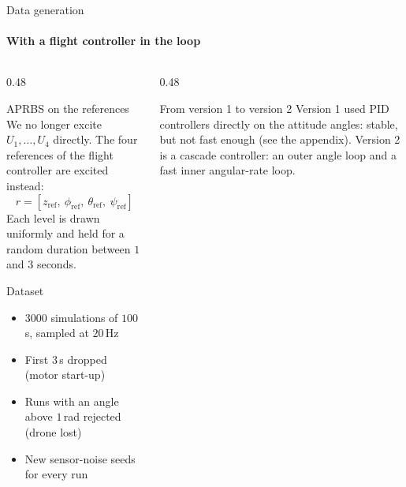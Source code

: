 \begin{frame}{Data generation}
    \framesubtitle{With a flight controller in the loop}

    \begin{columns}[T,onlytextwidth]
        \begin{column}{0.48\textwidth}
            \begin{block}{APRBS on the references}
                \footnotesize
                We no longer excite $U_1,\dots,U_4$ directly. The four
                references of the flight controller are excited instead:
                \[
                    r = [z_{\mathrm{ref}},\ \phi_{\mathrm{ref}},\
                    \theta_{\mathrm{ref}},\ \psi_{\mathrm{ref}}]
                \]
                Each level is drawn uniformly and held for a random
                duration between $1$ and $3$ seconds.
            \end{block}

            \begin{block}{Dataset}
                \footnotesize
                \begin{itemize}\setlength{\itemsep}{0pt}
                    \item $3000$ simulations of $100$\,s, sampled at $20$\,Hz
                    \item First $3$\,s dropped (motor start-up)
                    \item Runs with an angle above $1$\,rad rejected
                    (drone lost)
                    \item New sensor-noise seeds for every run
                \end{itemize}
            \end{block}
        \end{column}

        \begin{column}{0.48\textwidth}
            \begin{block}{From version 1 to version 2}
                \footnotesize
                Version 1 used PID controllers directly on the attitude
                angles: stable, but not fast enough (see the appendix).
                Version 2 is a cascade controller: an outer angle loop and a
                fast inner angular-rate loop.
            \end{block}


\end{column}
\end{columns}
\end{frame}
